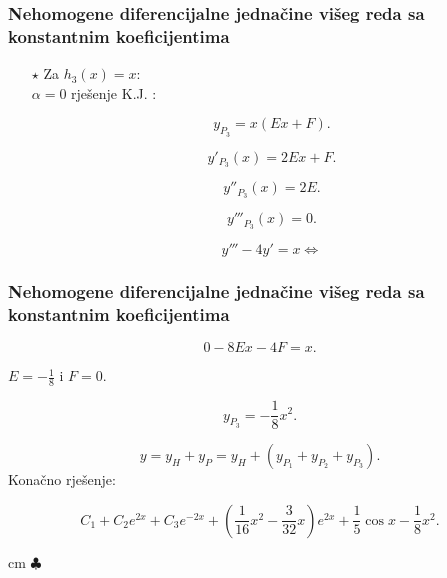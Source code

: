 \documentclass{beamer}
\begin{document}
\begin{frame}
\frametitle{Nehomogene diferencijalne jednačine višeg reda sa konstantnim koeficijentima}




\begin{enumerate}
\item[$\star$] Za $h_{3}(x) = x$:\\

$\alpha = 0$ rješenje K.J. :

$$y_{P_{3}} = x(Ex + F).$$

$$y'_{P_{3}}(x) = 2Ex + F .$$ 

$$y''_{P_{3}}(x) = 2E .$$ 

$$y'''_{P_{3}}(x) = 0 .$$ 

$$y''' - 4y' = x \Longleftrightarrow$$


\end{enumerate}
\end{frame}
\begin{frame}
\frametitle{Nehomogene diferencijalne jednačine višeg reda sa konstantnim koeficijentima}


$$0 - 8Ex - 4F = x.$$

$E = -\frac{1}{8}$ i $F =0.$

$$y_{P_{3}} = -\frac{1}{8}x^{2}.$$


$$y = y_{H} + y_{P} = y_{H} + (y_{P_{1}} + y_{P_{2}} + y_{P_{3}}).$$  
Konačno rješenje:

$$C_{1} + C_{2}e^{2x} + C_{3}e^{-2x} + \left(\frac{1}{16}x^{2} -\frac{3}{32}x \right)e^{2x} + \frac{1}{5} \cos{x} -\frac{1}{8}x^{2}. $$

 cm $\clubsuit$ \\

\end{frame}
\end{document}
